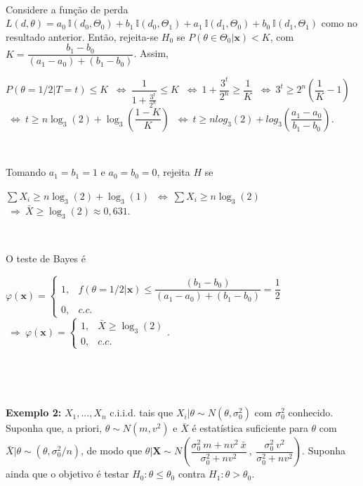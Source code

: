 \documentclass[
]{book}
\begin{document}
\(~\)

Considere a função de perda \(L(d,\theta) = a_0~\mathbb{I}(d_0,\Theta_0) + b_1~\mathbb{I}(d_0,\Theta_1) + a_1~\mathbb{I}(d_1,\Theta_0) + b_0~\mathbb{I}(d_1,\Theta_1)\) como no resultado anterior. Então, rejeita-se \(H_0\) se \(P(\theta \in \Theta_0 | \boldsymbol x) < K\), com \(K = \dfrac{b_1-b_0}{(a_1-a_0)+(b_1-b_0)}\). Assim,

\(P(\theta=1/2|T=t)\leq K\)
\(~\Longleftrightarrow~ \dfrac{1}{1+\frac{3^t}{2^n}} \leq K\)
\(~\Longleftrightarrow~ {1+\dfrac{3^t}{2^n}} \geq \dfrac{1}{K}\)
\(~\Longleftrightarrow~ 3^t\geq 2^n\left(\dfrac{1}{K}-1\right)\)
\(~\Longleftrightarrow~ t\geq n\log_3(2)+\log_3\left(\dfrac{1-K}{K}\right)\) \(~\Longleftrightarrow~ t\geq nlog_3(2)+log_3\left(\dfrac{a_1-a_0}{b_1-b_0}\right)\).

\(~\)

Tomando \(a_1=b_1=1\) e \(a_0=b_0=0\), rejeita \(H\) se

\(\sum X_i \geq n\log_3(2)+\log_3(1)\) \(~\Longleftrightarrow~ \sum X_i \geq n\log_3(2)\)
\(~\Longrightarrow~ \bar{X} \geq \log_3(2)\approx 0,631\).

\(~\)

O teste de Bayes é

\({\varphi}(\boldsymbol x) =\left\{\begin{array}{rl} 1,& f(\theta=1/2|\boldsymbol x) \leq \dfrac{(b_1-b_0)}{(a_1-a_0)+(b_1-b_0)} = \dfrac{1}{2} \\ 0,& c.c.\end{array}\right.\)
\(~\Longrightarrow~ {\varphi}(\boldsymbol x) =\left\{\begin{array}{rl} 1,& \bar{X} \geq \log_3(2) \\ 0,& c.c.\end{array}\right.\).

\(~\)

\(~\)

\textbf{Exemplo 2:} \(X_1,...,X_n\) c.i.i.d. tais que \(X_i|\theta\sim N(\theta,{\sigma}_0^2)\) com \({\sigma}_0^2\) conhecido. Suponha que, a priori, \(\theta \sim N(m,v^2)\) e \(\bar{X}\) é estatística suficiente para \(\theta\) com \(\bar{X}|\theta \sim \left(\theta,{\sigma}_0^2/n\right)\), de modo que \(\theta|\boldsymbol X \sim N\left(\dfrac{{\sigma}_0^2~m+nv^2~\bar x}{{\sigma}_0^2+nv^2}~,~\dfrac{{\sigma}_0^2~v^2}{{\sigma}_0^2+nv^2}\right)\). Suponha ainda que o objetivo é testar \(H_0: \theta\leq \theta_0\) contra \(H_1:\theta > \theta_0\).

\(~\)
\end{document}
